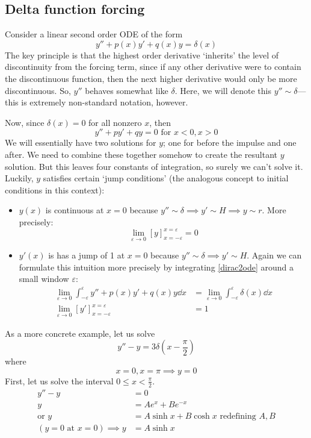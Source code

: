 \subsection{Delta function forcing}
Consider a linear second order ODE of the form
\begin{equation}\label{dirac2ode}
	y'' + p(x)y' + q(x)y = \delta(x)
\end{equation}
The key principle is that the highest order derivative `inherits' the level of discontinuity from the forcing term, since if any other derivative were to contain the discontinuous function, then the next higher derivative would only be more discontinuous.
So, \(y''\) behaves somewhat like \(\delta\).
Here, we will denote this \(y'' \sim \delta\)---this is extremely non-standard notation, however.

Now, since \(\delta(x) = 0\) for all nonzero \(x\), then
\[
	y''+py'+qy=0 \text{ for } x<0, x>0
\]
We will essentially have two solutions for \(y\); one for before the impulse and one after.
We need to combine these together somehow to create the resultant \(y\) solution.
But this leaves four constants of integration, so surely we can't solve it.
Luckily, \(y\) satisfies certain `jump conditions' (the analogous concept to initial conditions in this context):
\begin{itemize}
	\item \(y(x)\) is continuous at \(x=0\) because \(y'' \sim \delta \implies y' \sim H \implies y \sim r\).
	      More precisely:
	      \[
		      \lim_{\varepsilon \to 0} [y]_{x=-\varepsilon}^{x=\varepsilon} = 0
	      \]
	\item \(y'(x)\) is has a jump of 1 at \(x=0\) because \(y'' \sim \delta \implies y' \sim H\).
	      Again we can formulate this intuition more precisely by integrating \eqref{dirac2ode} around a small window \(\varepsilon\):
	      \begin{align*}
		      \lim_{\varepsilon \to 0} \int_{-\varepsilon}^\varepsilon y'' + p(x)y' + q(x)y \dd{x} & = \lim_{\varepsilon \to 0} \int_{-\varepsilon}^\varepsilon \delta(x) \dd{x} \\
		      \lim_{\varepsilon \to 0} [y']_{x=-\varepsilon}^{x=\varepsilon}                       & = 1
	      \end{align*}
\end{itemize}
As a more concrete example, let us solve
\[
	y'' - y = 3 \delta\left(x - \frac{\pi}{2}\right)
\]
where
\[
	x = 0, x = \pi \implies y = 0
\]
First, let us solve the interval \(0 \leq x < \frac{\pi}{2}\).
\begin{align*}
	y'' - y                              & = 0                                              \\
	y                                    & = Ae^x + Be^{-x}                                 \\
	\text{or } y                         & = A \sinh x + B \cosh x \text{ redefining } A, B \\
	(y = 0 \text{ at } x = 0) \implies y & = A \sinh x
\end{align*}
